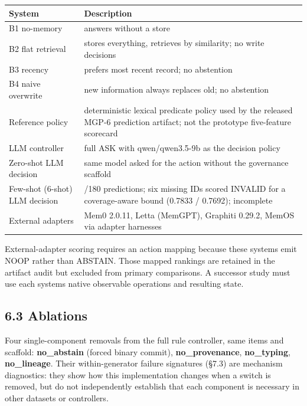{\def\LTcaptype{none} %
\begin{longtable}[]{@{}
  >{\raggedright\arraybackslash}p{}
  >{\centering\arraybackslash}p{}@{}}
\toprule\noalign{}
\begin{minipage}[b]{\linewidth}\raggedright
\textbf{System}
\end{minipage} & \begin{minipage}[b]{\linewidth}\centering
\textbf{Description}
\end{minipage} \\
\midrule\noalign{}
\endhead
\bottomrule\noalign{}
\endlastfoot
B1 no-memory & answers without a store \\
B2 flat retrieval & stores everything, retrieves by similarity; no write
decisions \\
B3 recency & prefers most recent record; no abstention \\
B4 naive overwrite & new information always replaces old; no
abstention \\
Reference policy & deterministic lexical predicate policy used by the
released MGP-6 prediction artifact; not the prototype five-feature
scorecard \\
LLM controller & full ASK with qwen/qwen3.5-9b as the decision policy \\
Zero-shot LLM decision & same model asked for the action without the
governance scaffold \\
Few-shot (6-shot) LLM decision & 174/180 predictions; six missing IDs
scored INVALID for a coverage-aware bound (0.7833 / 0.7692);
incomplete \\
External adapters & Mem0 2.0.11, Letta (MemGPT), Graphiti 0.29.2, MemOS
via adapter harnesses \\
\end{longtable}
}

External-adapter scoring requires an action mapping because these
systems emit NOOP rather than ABSTAIN. Those mapped rankings are
retained in the artifact audit but excluded from primary comparisons. A
successor study must use each system\textquotesingle s native observable
operations and resulting state.

\subsection{6.3 Ablations}\label{ablations}

Four single-component removals from the full rule controller, same items
and scaffold: \textbf{no\_abstain} (forced binary commit),
\textbf{no\_provenance}, \textbf{no\_typing}, \textbf{no\_lineage}.
Their within-generator failure signatures (§7.3) are mechanism
diagnostics: they show how this implementation changes when a switch is
removed, but do not independently establish that each component is
necessary in other datasets or controllers.


